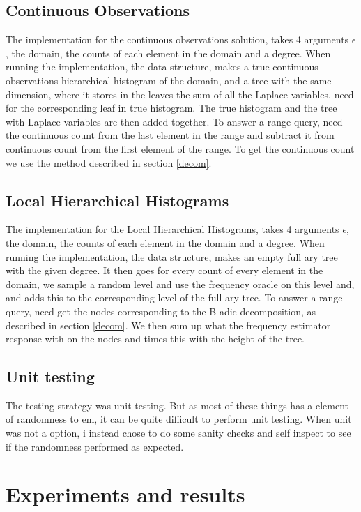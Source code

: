 \documentclass[11pt]{article}
\theoremstyle{definition}
\begin{document}
\subsection{Continuous Observations}
The implementation for the continuous observations solution, takes 4 arguments $\epsilon$, the domain, the counts of each element in the domain and a degree. 
When running the implementation, the data structure, makes a true continuous observations hierarchical histogram of the domain, and a tree with the same dimension, where it stores in the leaves the sum of all the Laplace variables, need for the corresponding leaf in true histogram. The true histogram and the tree with Laplace variables are then added together. To answer a range query, need the continuous count from the last element in the range and subtract it from continuous count from the first element of the range. To get the continuous count we use the method described in section \ref{decom}. 

\subsection{Local Hierarchical Histograms}
The implementation for the Local Hierarchical Histograms, takes 4 arguments $\epsilon$, the domain, the counts of each element in the domain and a degree. 
When running the implementation, the data structure, makes an empty full ary tree with the given degree. It then goes for every count of every element in the domain, we sample a random level and use the frequency oracle on this level and, and adds this to the corresponding level of the full ary tree. To answer a range query, need get the nodes corresponding to the B-adic decomposition, as described in section \ref{decom}. We then sum up what the frequency estimator response with on the nodes and times this with the height of the tree.

\subsection{Unit testing}
The testing strategy was unit testing. But as most of these things has a element of randomness to em, it can be quite difficult to perform unit testing. When unit was not a option, i instead chose to do some sanity checks and self inspect to see if the randomness performed as expected. 

\section{Experiments and results}
\end{document}
